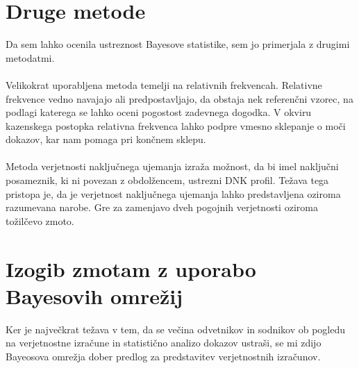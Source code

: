 \documentclass[12pt,a4paper]{amsart}
\theoremstyle{definition} %
\theoremstyle{plain} %
\begin{document}
\section{Druge metode}
Da sem lahko ocenila ustreznost Bayesove statistike, sem jo primerjala z drugimi metodatmi.\\\\
Velikokrat uporabljena metoda temelji na relativnih frekvencah. Relativne frekvence vedno navajajo ali predpostavljajo, da obstaja nek
referenčni vzorec, na podlagi katerega se lahko oceni pogostost zadevnega dogodka. V okviru kazenskega postopka relativna frekvenca lahko podpre
vmesno sklepanje o moči dokazov, kar nam pomaga pri končnem sklepu.\\\\
Metoda verjetnosti naključnega ujemanja izraža možnost, da bi imel naključni posameznik, ki ni povezan z obdolžencem,
ustrezni DNK profil. Težava tega pristopa je, da je verjetnost naključnega ujemanja lahko predstavljena
oziroma razumevana narobe. Gre za zamenjavo dveh pogojnih verjetnosti oziroma tožilčevo zmoto.


\section{Izogib zmotam z uporabo Bayesovih omrežij}
Ker je največkrat težava v tem, da se večina odvetnikov in sodnikov ob pogledu na verjetnostne izračune in statistično analizo dokazov ustraši, se mi 
zdijo Bayeosova omrežja dober predlog za predstavitev verjetnostnih izračunov.

\end{document}

